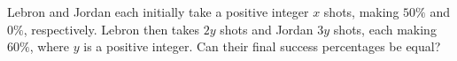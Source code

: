 Lebron and Jordan each initially take a positive integer $x$ shots, making $50\%$ and $0\%$, respectively. Lebron then takes $2y$ shots and Jordan $3y$ shots, each making $60\%$, where $y$ is a positive integer. Can their final success percentages be equal?
